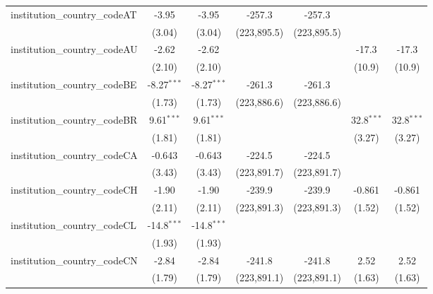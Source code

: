 \begin{tabular}{lcccccc}
   institution\_country\_codeAT          & -3.95         & -3.95         & -257.3        & -257.3        &               &   \\   
                                         & (3.04)        & (3.04)        & (223,895.5)   & (223,895.5)   &               &   \\   
   institution\_country\_codeAU          & -2.62         & -2.62         &               &               & -17.3         & -17.3\\   
                                         & (2.10)        & (2.10)        &               &               & (10.9)        & (10.9)\\   
   institution\_country\_codeBE          & -8.27$^{***}$ & -8.27$^{***}$ & -261.3        & -261.3        &               &   \\   
                                         & (1.73)        & (1.73)        & (223,886.6)   & (223,886.6)   &               &   \\   
   institution\_country\_codeBR          & 9.61$^{***}$  & 9.61$^{***}$  &               &               & 32.8$^{***}$  & 32.8$^{***}$\\   
                                         & (1.81)        & (1.81)        &               &               & (3.27)        & (3.27)\\   
   institution\_country\_codeCA          & -0.643        & -0.643        & -224.5        & -224.5        &               &   \\   
                                         & (3.43)        & (3.43)        & (223,891.7)   & (223,891.7)   &               &   \\   
   institution\_country\_codeCH          & -1.90         & -1.90         & -239.9        & -239.9        & -0.861        & -0.861\\   
                                         & (2.11)        & (2.11)        & (223,891.3)   & (223,891.3)   & (1.52)        & (1.52)\\   
   institution\_country\_codeCL          & -14.8$^{***}$ & -14.8$^{***}$ &               &               &               &   \\   
                                         & (1.93)        & (1.93)        &               &               &               &   \\   
   institution\_country\_codeCN          & -2.84         & -2.84         & -241.8        & -241.8        & 2.52          & 2.52\\   
                                         & (1.79)        & (1.79)        & (223,891.1)   & (223,891.1)   & (1.63)        & (1.63)\\   

\end{tabular}
